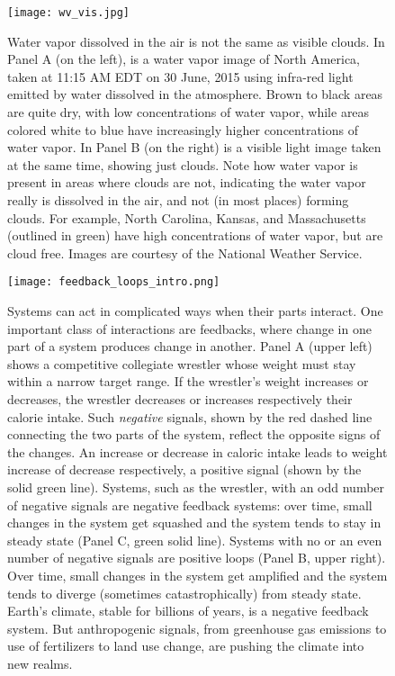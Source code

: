 \begin{figure}[p]
\centering
\texttt{[image: wv\_vis.jpg]}%
\caption{Water vapor dissolved in the air is not the same as visible clouds. In Panel A (on the left), is a water vapor image of North America, taken at 11:15 AM EDT on 30 June, 2015 using infra-red light emitted by water dissolved in the atmosphere. Brown to black areas are quite dry, with low concentrations of water vapor, while areas colored white to blue have increasingly higher concentrations of water vapor. In Panel B (on the right) is a visible light image taken at the same time, showing just clouds. Note how water vapor is present in areas where clouds are not, indicating the water vapor really is dissolved in the air, and not (in most places) forming clouds. For example, North Carolina, Kansas, and Massachusetts (outlined in green) have high concentrations of water vapor, but are cloud free. Images are courtesy of the National Weather Service.}   
\label{fig:wv_vis}
\end{figure}

\begin{figure}[p]
\centering
\texttt{[image: feedback\_loops\_intro.png]}%
\caption{Systems can act in complicated ways when their parts interact. One important class of interactions are feedbacks, where change in one part of a system produces change in another. Panel A (upper left) shows a competitive collegiate wrestler whose weight must stay within a narrow target range. If the wrestler's weight increases or decreases, the wrestler decreases or increases respectively their calorie intake. Such \emph{negative} signals, shown by the red dashed line connecting the two parts of the system, reflect the opposite signs of the changes. An increase or decrease in caloric intake leads to weight increase of decrease respectively, a positive signal (shown by the solid green line). Systems, such as the wrestler, with an odd number of negative signals are negative feedback systems: over time, small changes in the system get squashed and the system tends to stay in steady state (Panel C, green solid line). Systems with no or an even number of negative signals are positive loops (Panel B, upper right). Over time, small changes in the system get amplified and the system tends to diverge (sometimes catastrophically) from steady state. Earth's climate, stable for billions of years, is a negative feedback system. But anthropogenic signals, from greenhouse gas emissions to use of fertilizers to land use change, are pushing the climate into new realms.}   
\label{fig:feedback_loops_intro}
\end{figure}


